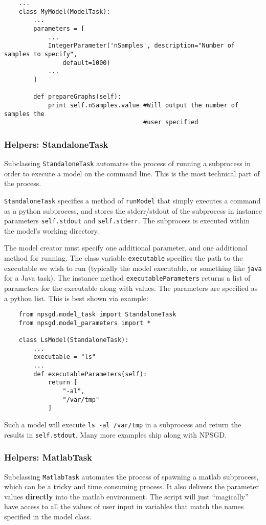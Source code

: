 \documentclass{article}
\newcommand{\mclass}[1]{\texttt{#1}}
\begin{document}
\begin{lstlisting}
    ...
    class MyModel(ModelTask):
        ...
        parameters = [
            ...
            IntegerParameter('nSamples', description="Number of samples to specify",
                default=1000)
            ...
        ]

        def prepareGraphs(self):
            print self.nSamples.value #Will output the number of samples the
                                      #user specified

\end{lstlisting}

\subsubsection{Helpers: StandaloneTask}
Subclassing \mclass{StandaloneTask} automates the process of running a
subprocess in order to execute a model on the command line. This is the most
technical part of the process.

\mclass{StandaloneTask} specifies a method of \texttt{runModel} that simply
executes a command as a python subprocess, and stores the stderr/stdout of the
subprocess in instance parameters \texttt{self.stdout} and \texttt{self.stderr}.
The subprocess is executed within the model's working directory. 

The model creator must specify one additional parameter, and one additional
method for running. The class variable \texttt{executable} specifies the path to
the executable we wish to run (typically the model executable, or something like
\texttt{java} for a Java task). The instance method \texttt{executableParameters} returns
a list of parameters for the executable along with values. The parameters are
specified as a python list. This is best shown via example:

\begin{lstlisting}
    from npsgd.model_task import StandaloneTask
    from npsgd.model_parameters import *

    class LsModel(StandaloneTask):
        ...
        executable = "ls"
        ...
        def executableParameters(self):
            return [
                "-al",
                "/var/tmp"
            ]
\end{lstlisting}

Such a model will execute \texttt{ls -al /var/tmp} in a subprocess and return the results in
\texttt{self.stdout}. Many more examples ship along with NPSGD.

\subsubsection{Helpers: MatlabTask}
Subclassing \mclass{MatlabTask} automates the process of spawning a matlab
subprocess, which can be a tricky and time consuming process. It also delivers
the parameter values \textbf{directly} into the matlab environment. The script
will just ``magically'' have access to all the values of user input in variables
that match the names specified in the model class. 
\end{document}
